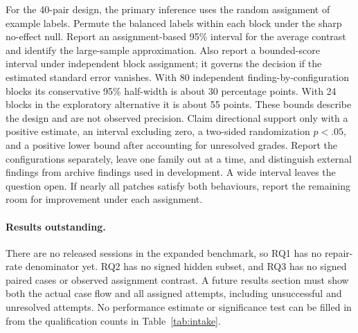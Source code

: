 For the 40-pair design, the primary inference uses the random assignment of example labels. Permute the balanced labels within each block under the sharp no-effect null. Report an assignment-based 95\% interval for the average contrast and identify the large-sample approximation. Also report a bounded-score interval under independent block assignment; it governs the decision if the estimated standard error vanishes. With 80 independent finding-by-configuration blocks its conservative 95\% half-width is about 30 percentage points. With 24 blocks in the exploratory alternative it is about 55 points. These bounds describe the design and are not observed precision. Claim directional support only with a positive estimate, an interval excluding zero, a two-sided randomization \(p<.05\), and a positive lower bound after accounting for unresolved grades. Report the configurations separately, leave one family out at a time, and distinguish external findings from archive findings used in development. A wide interval leaves the question open. If nearly all patches satisfy both behaviours, report the remaining room for improvement under each assignment.

\paragraph{Results outstanding.}
There are no released sessions in the expanded benchmark, so RQ1 has no repair-rate denominator yet. RQ2 has no signed hidden subset, and RQ3 has no signed paired cases or observed assignment contrast. A future results section must show both the actual case flow and all assigned attempts, including unsuccessful and unresolved attempts. No performance estimate or significance test can be filled in from the qualification counts in Table~\ref{tab:intake}.
